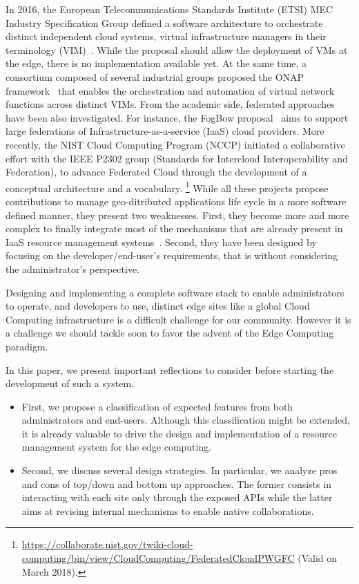 In 2016, the European Telecommunications Standards Institute (ETSI) MEC
Industry Specification Group defined  a software architecture
to orchestrate distinct independent cloud systems, \aka virtual
infrastructure managers in their terminology
(VIM)~\cite{7574435}. While the proposal should allow the deployment
of VMs at the edge, there is no implementation available yet.  At the
same time, a consortium composed of several industrial groups proposed
the ONAP framework~\cite{onap} that enables the orchestration and
automation of virtual network functions across distinct VIMs.  From
the academic side, federated approaches have been also investigated.
For instance, the FogBow proposal~\cite{brasileiro2016fogbow} aims to
support large federations of Infrastructure-as-a-service (IaaS) cloud
providers. More recently, the NIST Cloud Computing Program (NCCP)
initiated a collaborative effort with the IEEE P2302 group (Standards for Intercloud Interoperability and
Federation), to advance Federated Cloud through the development
of a conceptual architecture and a vocabulary.
\footnote{\url{https://collaborate.nist.gov/twiki-cloud-computing/bin/view/CloudComputing/FederatedCloudPWGFC} (Valid on March 2018).}
%
While all these projects propose contributions to manage
geo-ditributed applications life cycle in a more software defined manner, they present two
weaknesses. First, they become more and more complex to finally
integrate most of the mechanisms that are already present in
IaaS resource management systems~\cite{}.  Second,
they have been designed by focusing on the developer/end-user's
requirements, that is without considering the administrator's
perspective.

Designing and implementing a complete software stack to enable
administrators to operate, and developers to use, distinct edge sites
like a global Cloud Computing infrastructure is a difficult challenge
for our community. However it is a challenge we should tackle soon to
favor the advent of the Edge Computing paradigm.

In this paper, we
present important reflections to consider before starting the development of such a system.
\begin{itemize}
\item First, we propose a classification of expected features from
  both administrators and end-users. Although this classification might be extended, it is already valuable to drive the design and implementation of a resource management system for the edge computing.
    \item Second, we discuss several design strategies. In particular, we
  analyze pros and cons of top/down and bottom up approaches. The
  former consists in interacting with each site only through the exposed APIs
  while the latter aims at revising internal mechanisms to enable
  native collaborations.
  \end{itemize}

